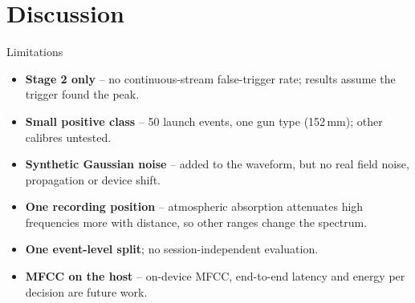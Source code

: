 \documentclass[aspectratio=169,10pt]{beamer}
\begin{document}
\section{Discussion}

\begin{frame}{Limitations}
  \begin{itemize}
    \item \textbf{Stage 2 only} -- no continuous-stream false-trigger rate; results assume
          the trigger found the peak.
    \item \textbf{Small positive class} -- 50 launch events, one gun type (152\,mm);
          other calibres untested.
    \item \textbf{Synthetic Gaussian noise} -- added to the waveform, but no real field
          noise, propagation or device shift.
    \item \textbf{One recording position} -- atmospheric absorption attenuates high
          frequencies more with distance, so other ranges change the spectrum.
    \item \textbf{One event-level split}; no session-independent evaluation.
    \item \textbf{MFCC on the host} -- on-device MFCC, end-to-end latency and energy per
          decision are future work.
  \end{itemize}
\end{frame}
\end{document}
